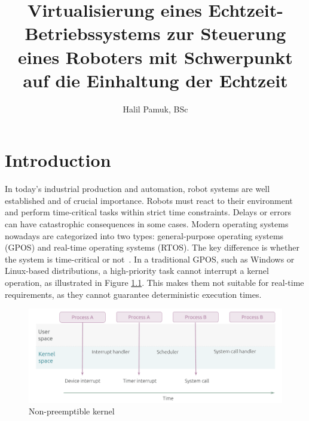 \documentclass[MMR,Master,english]{twbook}
\title{Virtualisierung eines Echtzeit-Betriebssystems zur Steuerung eines Roboters mit Schwerpunkt auf die
Einhaltung der Echtzeit}
\author{Halil Pamuk, BSc}
\begin{document}
\maketitle
%
%
%



\chapter{Introduction}\label{cha:introduction}
In today's industrial production and automation, robot systems are well established and of crucial importance. Robots must react to their environment and perform time-critical tasks within strict time constraints. Delays or errors can have catastrophic consequences in some cases. Modern operating systems nowadays are categorized into two types:  general-purpose operating systems (GPOS) and real-time operating systems (RTOS). The key difference is whether the system is time-critical or not~\cite{canbazPerformanceAnalysisRealtime2022}. In a traditional GPOS, such as Windows or Linux-based distributions, a high-priority task cannot interrupt a kernel operation, as illustrated in Figure \ref{fig:kernel_generic}. This makes them not suitable for real-time requirements, as they cannot guarantee deterministic execution times.

\begin{figure}[H]
	\centering
	\includegraphics[width=0.75\columnwidth]{img/introduction/kernel_generic.png}
	\caption[Non-preemptible kernel]{Non-preemptible kernel~\cite{WhatRealtimeLinuxa}}
	\label{fig:kernel_generic}
\end{figure}
\end{document}
